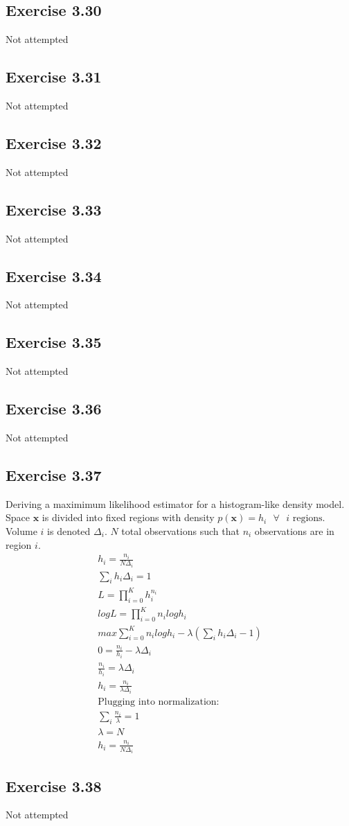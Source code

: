 \subsection{Exercise 3.30}
Not attempted

\subsection{Exercise 3.31}
Not attempted

\subsection{Exercise 3.32}
Not attempted

\subsection{Exercise 3.33}
Not attempted

\subsection{Exercise 3.34}
Not attempted

\subsection{Exercise 3.35}
Not attempted

\subsection{Exercise 3.36}
Not attempted

\subsection{Exercise 3.37}
Deriving a maximimum likelihood estimator for a histogram-like density model. Space $\mathbf{x}$ is divided into fixed regions with density $p(\mathbf{x}) = h_i \text{ }\forall\text{ } i \text{ regions}$. Volume $i$ is denoted $\Delta_i$. $N$ total observations such that $n_i$ observations are in region $i$.
\begin{gather}
  h_i = \frac{n_i}{N\Delta_i} \\
  \sum_i h_i\Delta_i = 1 \\
  L = \prod_{i=0}^{K} h_i^{n_i} \\
  log L = \prod_{i=0}^{K} n_i log h_i \\
  max \sum_{i=0}^{K} n_i log h_i - \lambda(\sum_i h_i\Delta_i - 1) \\ 
  0 = \frac{n_i}{h_i} - \lambda\Delta_i \\
  \frac{n_i}{h_i} = \lambda \Delta_i \\ 
  h_i = \frac{n_i}{\lambda \Delta_i}\\
  \text{Plugging into normalization:} \\
  \sum_i \frac{n_i}{\lambda} = 1  \\
  \lambda = N \\
  h_i = \frac{n_i}{N\Delta_i}
\end{gather}

\subsection{Exercise 3.38}
Not attempted